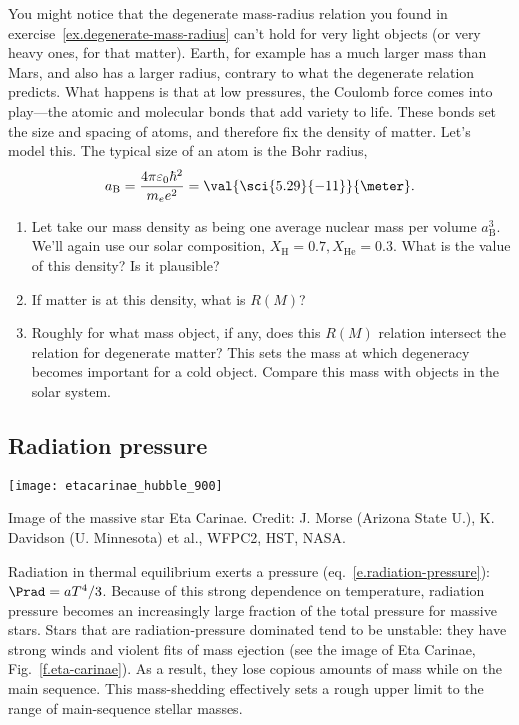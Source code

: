 \begin{exercisebox}
\label{ex.planetary-M-and-R}
You might notice that the degenerate mass-radius relation you found in exercise~\ref{ex.degenerate-mass-radius} can't hold for very light objects (or very heavy ones, for that matter). Earth, for example has a much larger mass than Mars, and also has a larger radius, contrary to what the degenerate relation predicts. What happens is that at low pressures, the Coulomb force comes into play---the atomic and molecular bonds that add variety to life. These bonds set the size and spacing of atoms, and therefore fix the density of matter. Let's model this. The typical size of an atom is the Bohr radius,
\[
	a_{\mathrm{B}} = \frac{4\pi\varepsilon_{0}\hbar^{2}}{m_{e}e^{2}} = \val{\sci{5.29}{-11}}{\meter}.
\]
	\begin{enumerate}
	\item Let take our mass density as being one average nuclear mass per volume $a_{\mathrm{B}}^{3}$.  We'll again use our solar composition, $X_{\mathrm{H}}=0.7, X_{\mathrm{He}}=0.3$.
What is the value of this density? Is it plausible?
	\item If matter is at this density, what is $R(M)$?
	\item Roughly for what mass object, if any, does this $R(M)$ relation intersect the relation for degenerate matter? This sets the mass at which degeneracy becomes important for a cold object. Compare this mass with objects in the solar system.
	\end{enumerate}
\end{exercisebox}

\subsection{Radiation pressure}
\label{s.radiation-pressure}

\begin{marginfigure}
\texttt{[image: etacarinae\_hubble\_900]}
\caption[Image of the massive star Eta Carinae]{\label{f.eta-carinae} Image of the massive star Eta Carinae. Credit: J. Morse (Arizona State U.), K. Davidson (U. Minnesota) et al., WFPC2, HST, NASA.}
\end{marginfigure}
Radiation in thermal equilibrium exerts a pressure (eq.~\ref{e.radiation-pressure}): $\Prad = aT^{4}/3$. Because of this strong dependence on temperature, radiation pressure becomes an increasingly large fraction of the total pressure for massive stars. Stars that are radiation-pressure dominated tend to be unstable: they have strong winds and violent fits of mass ejection (see the image of Eta Carinae, Fig.~\ref{f.eta-carinae}). As a result, they lose copious amounts of mass while on the main sequence. This mass-shedding effectively sets a rough upper limit to the range of main-sequence stellar masses.

